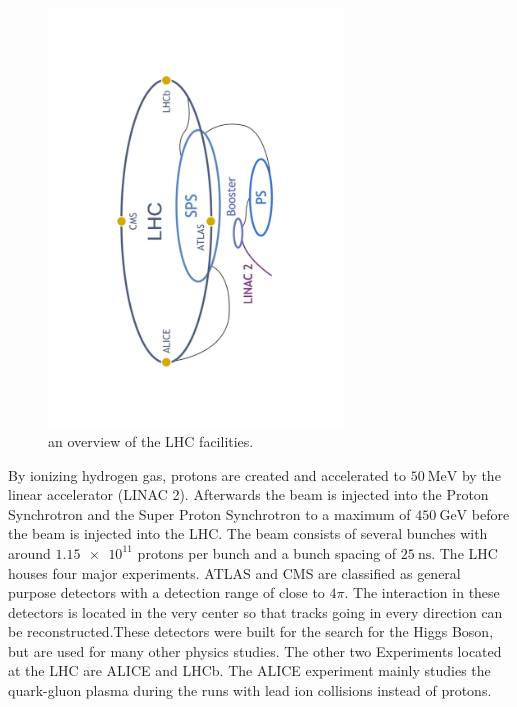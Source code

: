 \begin{figure}
  \centering
  \includegraphics[angle=-90, origin=c, width=0.7\textwidth]{plots/CERN_layout.pdf}
  \caption{an overview of the LHC facilities\cite{facilityCERN}.}
  \label{fig:CERN}
\end{figure}

By ionizing hydrogen gas, protons are created and accelerated to $\SI{50}{\mega\electronvolt}$ by the linear accelerator (LINAC 2). Afterwards the beam is injected into the Proton Synchrotron and the Super Proton Synchrotron to a maximum of $\SI{450}{\giga\electronvolt}$ before the beam is injected into the LHC.
The beam consists of several bunches with around $\num{1.15e11}$ protons per bunch and a bunch spacing of $\SI{25}{\nano\second}$.%
The LHC houses four major experiments. ATLAS and CMS are classified as general purpose detectors with a detection range of close to $4\pi$. The interaction in these detectors is located in the very center so that tracks going in every direction can be reconstructed.These detectors were built for the search for the Higgs Boson, but are used for many other physics studies.
The other two Experiments located at the LHC are ALICE and LHCb.
The ALICE experiment mainly studies the quark-gluon plasma during the runs with lead ion collisions instead of protons.

